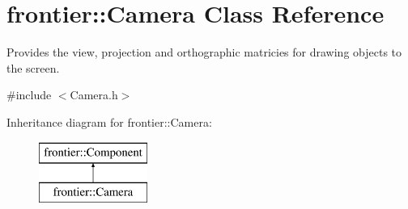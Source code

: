 \hypertarget{classfrontier_1_1_camera}{}\section{frontier\+:\+:Camera Class Reference}
\label{classfrontier_1_1_camera}


Provides the view, projection and orthographic matricies for drawing objects to the screen.  




{\ttfamily \#include $<$Camera.\+h$>$}

Inheritance diagram for frontier\+:\+:Camera\+:\begin{figure}[H]
\begin{center}
\leavevmode
\includegraphics[height=2.000000cm]{classfrontier_1_1_camera}
\end{center}
\end{figure}
